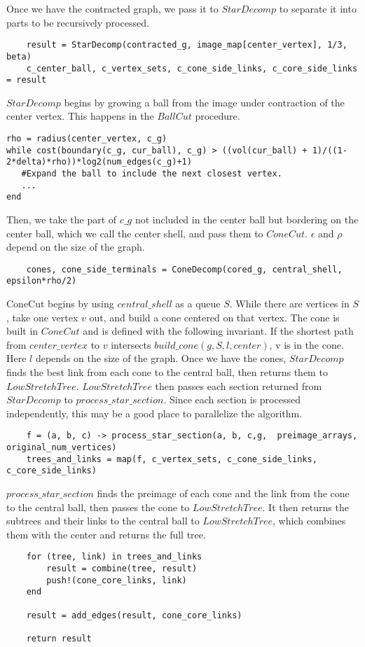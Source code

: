 \documentclass{article}
\begin{document}
Once we have the contracted graph, we pass it to $StarDecomp$ to separate it into parts to be recursively processed.
\begin{verbatim}
	result = StarDecomp(contracted_g, image_map[center_vertex], 1/3, beta)
	c_center_ball, c_vertex_sets, c_cone_side_links, c_core_side_links = result
\end{verbatim}
$StarDecomp$ begins by growing a ball from the image under contraction of the center vertex.  This happens in the $BallCut$ procedure. 
\begin{verbatim}
rho = radius(center_vertex, c_g)
while cost(boundary(c_g, cur_ball), c_g) > ((vol(cur_ball) + 1)/((1-2*delta)*rho))*log2(num_edges(c_g)+1)
   #Expand the ball to include the next closest vertex.
   ...
end
\end{verbatim}
Then, we take the part of $c\_g$ not included in the center ball but bordering on the center ball, which we call the center shell, and pass them to $ConeCut$.  $\epsilon$ and $\rho$ depend on the size of the graph.
\begin{verbatim}
	cones, cone_side_terminals = ConeDecomp(cored_g, central_shell, epsilon*rho/2)
\end{verbatim}
ConeCut begins by using $central\_shell$ as a queue $S$.  While there are vertices in $S$, take one vertex $v$ out, and build a cone centered on that vertex.  The cone is built in $ConeCut$ and is defined with the following invariant.  If the shortest path from $center\_vertex$ to $v$ intersects $build\_cone(g, S, l, center)$, v is in the cone.  Here $l$ depends on the size of the graph.
Once we have the cones, $StarDecomp$ finds the best link from each cone to the central ball, then returns them to $LowStretchTree$.  $LowStretchTree$ then passes each section returned from $StarDecomp$ to $process\_star\_section$.  Since each section is processed independently, this may be a good place to parallelize the algorithm. 
\begin{verbatim}
	f = (a, b, c) -> process_star_section(a, b, c,g,  preimage_arrays, original_num_vertices)
	trees_and_links = map(f, c_vertex_sets, c_cone_side_links, c_core_side_links)
\end{verbatim}
$process\_star\_section$ finds the preimage of each cone and the link from the cone to the central ball, then passes the cone to $LowStretchTree$.   It then returns the subtrees and their links to the central ball to $LowStretchTree$, which combines them with the center and returns the full tree.
\begin{verbatim}
	for (tree, link) in trees_and_links
		result = combine(tree, result)
		push!(cone_core_links, link)
	end

	result = add_edges(result, cone_core_links)

	return result
\end{verbatim}
\end{document}
